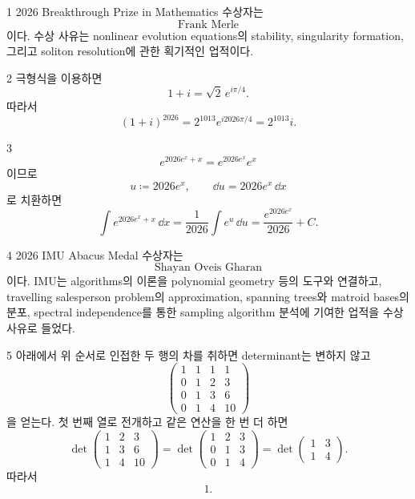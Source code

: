 \documentclass[11pt,oneside]{article}
\begin{document}

\begin{problemsolution}{1}
2026 Breakthrough Prize in Mathematics 수상자는
\[
    \boxed{\text{Frank Merle}}
\]
이다. 수상 사유는 nonlinear evolution equations의 stability, singularity formation, 그리고 soliton resolution에 관한 획기적인 업적이다.
\end{problemsolution}

\begin{problemsolution}{2}
극형식을 이용하면
\[
    1+i=\sqrt2\,e^{i\pi/4}.
\]
따라서
\[
    (1+i)^{2026}
    =
    2^{1013}e^{i2026\pi/4}
    =
    \boxed{2^{1013}i}.
\]
\end{problemsolution}

\begin{problemsolution}{3}
\[
    e^{2026e^x+x}
    =
    e^{2026e^x}e^x
\]
이므로
\[
    u\coloneqq 2026e^x,
    \qquad
    \dd u=2026e^x\,\dd x
\]
로 치환하면
\[
    \int e^{2026e^x+x}\,\dd x
    =
    \frac{1}{2026}\int e^u\,\dd u
    =
    \boxed{\frac{e^{2026e^x}}{2026}+C}.
\]
\end{problemsolution}

\begin{problemsolution}{4}
2026 IMU Abacus Medal 수상자는
\[
    \boxed{\text{Shayan Oveis Gharan}}
\]
이다. IMU는 algorithms의 이론을 polynomial geometry 등의 도구와 연결하고, travelling salesperson problem의 approximation, spanning trees와 matroid bases의 분포, spectral independence를 통한 sampling algorithm 분석에 기여한 업적을 수상 사유로 들었다.
\end{problemsolution}

\begin{problemsolution}{5}
아래에서 위 순서로 인접한 두 행의 차를 취하면 determinant는 변하지 않고
\[
    \begin{pmatrix}
        1&1&1&1\\
        0&1&2&3\\
        0&1&3&6\\
        0&1&4&10
    \end{pmatrix}
\]
을 얻는다. 첫 번째 열로 전개하고 같은 연산을 한 번 더 하면
\[
    \det
    \begin{pmatrix}
        1&2&3\\
        1&3&6\\
        1&4&10
    \end{pmatrix}
    =
    \det
    \begin{pmatrix}
        1&2&3\\
        0&1&3\\
        0&1&4
    \end{pmatrix}
    =
    \det
    \begin{pmatrix}
        1&3\\
        1&4
    \end{pmatrix}.
\]
따라서
\[
    \boxed{1}.
\]
\end{problemsolution}
\end{document}
